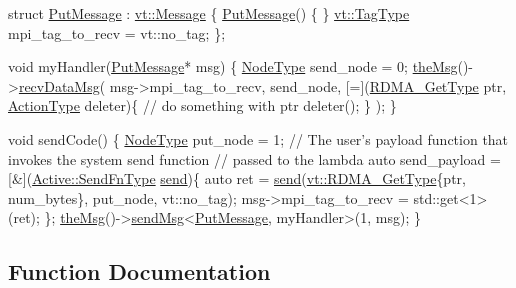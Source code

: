 \begin{DoxyCode}
\textcolor{keyword}{struct }\hyperlink{namespacevt_1_1rdma_ae0a0330c647ec5ac5d508750f4cd4a06}{PutMessage} : \hyperlink{structvt_1_1messaging_1_1_active_msg}{vt::Message} \{
  \hyperlink{namespacevt_1_1rdma_ae0a0330c647ec5ac5d508750f4cd4a06}{PutMessage}() \{ \}
  \hyperlink{namespacevt_a84ab281dae04a52a4b243d6bf62d0e52}{vt::TagType} mpi\_tag\_to\_recv = vt::no\_tag;
\};

\textcolor{keywordtype}{void} myHandler(\hyperlink{namespacevt_1_1rdma_ae0a0330c647ec5ac5d508750f4cd4a06}{PutMessage}* msg) \{
  \hyperlink{namespacevt_a866da9d0efc19c0a1ce79e9e492f47e2}{NodeType} send\_node = 0;
  \hyperlink{namespacevt_aeafd31f866aeb4dc6fc2f6ee97136350}{theMsg}()->\hyperlink{structvt_1_1messaging_1_1_active_messenger_a33b2e3e047d0b1f6eb1398691f075b31}{recvDataMsg}(
    msg->mpi\_tag\_to\_recv, send\_node,
    [=](\hyperlink{namespacevt_a1cab7f4860f65a49ad2c042d6240f288}{RDMA\_GetType} ptr, \hyperlink{namespacevt_ae0a5a7b18cc99d7b732cb4d44f46b0f3}{ActionType} deleter)\{
       \textcolor{comment}{// do something with ptr}
       deleter();
    \}
  );
\}

\textcolor{keywordtype}{void} sendCode() \{
  \hyperlink{namespacevt_a866da9d0efc19c0a1ce79e9e492f47e2}{NodeType} put\_node = 1;
  \textcolor{comment}{// The user's payload function that invokes the system send function}
  \textcolor{comment}{// passed to the lambda}
  \textcolor{keyword}{auto} send\_payload = [&](\hyperlink{structvt_1_1messaging_1_1_active_messenger_a9821bc2d924729107f08fadf5a217537}{Active::SendFnType} \hyperlink{namespacevt_1_1objgroup_aa2e134493c6b8a23d7d5e86bd9df1a70}{send})\{
    \textcolor{keyword}{auto} ret = \hyperlink{namespacevt_1_1objgroup_aa2e134493c6b8a23d7d5e86bd9df1a70}{send}(\hyperlink{namespacevt_a1cab7f4860f65a49ad2c042d6240f288}{vt::RDMA\_GetType}\{ptr, num\_bytes\}, put\_node, vt::no\_tag);
    msg->mpi\_tag\_to\_recv = std::get<1>(ret);
  \};
  \hyperlink{namespacevt_aeafd31f866aeb4dc6fc2f6ee97136350}{theMsg}()->\hyperlink{group__preregister_gaebfcd932babb3be0ea8d481f655a2835}{sendMsg}<\hyperlink{namespacevt_1_1rdma_ae0a0330c647ec5ac5d508750f4cd4a06}{PutMessage}, myHandler>(1, msg);
\}
\end{DoxyCode}
 

\subsection{Function Documentation}
\mbox{\label{group__sendpayload_ga90a75f1f1bbff156dca7a2237eec1800}} 

